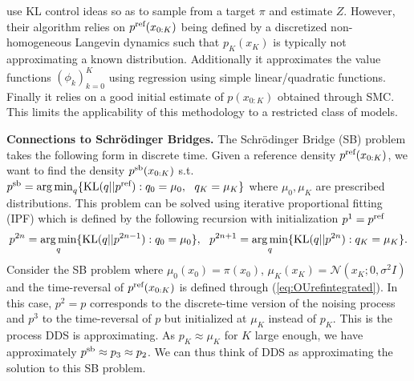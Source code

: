 \documentclass{article} %
\begin{document}
\cite{heng2020controlled} use KL control ideas so as to sample from a target $\pi$ and estimate $Z$. However, their algorithm relies on $p^{\textup{ref}}(x_{0:K})$ being defined by a discretized non-homogeneous Langevin dynamics such that $p_K(x_K)$ is typically not approximating a known distribution. Additionally it approximates the value functions $(\phi_k)_{k=0}^K$ using regression using simple linear/quadratic functions. Finally it relies on a good initial estimate of $p(x_{0:K})$ obtained through SMC. This limits the applicability of this methodology to a restricted class of models.



\textbf{Connections to Schr\"odinger Bridges.}
The Schr\"odinger Bridge (SB) problem \citep{leonard2013survey,debortoli2021diffusion} takes the following form in discrete time. Given a reference density $p^{\textup{ref}}(x_{0:K})$, we want to find the density $p^{\textup{sb}}(x_{0:K})$ s.t. $p^{\textup{sb}}=\operatorname*{arg\,min}_q \{\mathrm{KL}(q||p^{\textup{ref}}): q_0=\mu_0,~~q_K=\mu_K\}$ where $\mu_0,\mu_K$ are prescribed distributions. This problem can be solved using iterative proportional fitting (IPF) which is defined by the following recursion with initialization $p^1=p^{\textup{ref}}$
\begin{equation}
p^{2n}=\operatorname*{arg\,min}_q \{\mathrm{KL}(q||p^{2n-1}):q_0=\mu_0 \},~~
    p^{2n+1}=\operatorname*{arg\,min}_q \{\mathrm{KL}(q||p^{2n}):q_K=\mu_K \}.
\end{equation}
Consider the SB problem where $\mu_0(x_0)=\pi(x_0)$, $\mu_K(x_K)=\mathcal{N}(x_K;0,\sigma^2 I)$ and the time-reversal of $p^{\textup{ref}}(x_{0:K})$ is defined through (\ref{eq:OUrefintegrated}). In this case, $p^2=p$ corresponds to the discrete-time version of the noising process and $p^3$ to the time-reversal of $p$ but initialized at $\mu_K$ instead of $p_K$. This is the process DDS is approximating. As $p_K \approx \mu_K$ for $K$ large enough, we have approximately $p^{\textup{sb}} \approx p_3 \approx p_2$. We can thus think of DDS as approximating the solution to this SB problem.
\end{document}
